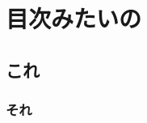 \documentclass[dvipdfmx]{jsarticle}
\begin{document}
\section{目次みたいの}
\subsection{これ}
\subsubsection{それ}
\end{document}
